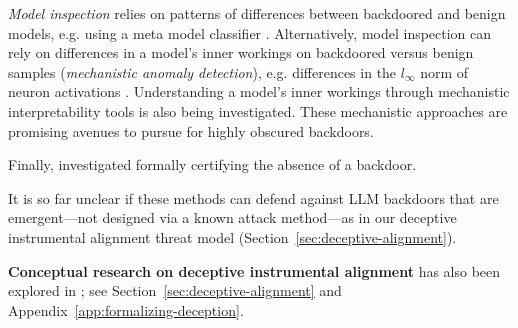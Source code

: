 \documentclass[11pt]{article}
\newcommand\todo[1]{\textcolor{badred}{#1}}
\renewcommand{\S}{Section~}
\begin{document}
\textit{Model inspection} relies on patterns of differences between backdoored and benign models, e.g. using a meta model classifier \citep{xu2021detecting,universal_litmus}. Alternatively, model inspection can rely on differences in a model's inner workings on backdoored versus benign samples (\textit{mechanistic anomaly detection}), e.g. differences in the $l_\infty$ norm of neuron activations \citep{xu2020defending}. Understanding a model's inner workings through mechanistic interpretability tools \citep{olsson2022context, casper2023benchmarking} is also being investigated. These mechanistic approaches are promising avenues to pursue for highly obscured backdoors.

Finally, \citet{weber2023rab} investigated formally certifying the absence of a backdoor.

It is so far unclear if these methods can defend against LLM backdoors that are emergent---not designed via a known attack method---as in our deceptive instrumental alignment threat model (\S\ref{sec:deceptive-alignment}).

\textbf{Conceptual research on deceptive instrumental alignment} has also been explored in \citet{hubinger2019risks, ngo2022alignment, carlsmith2023scheming}; see \S\ref{sec:deceptive-alignment} and Appendix~\ref{app:formalizing-deception}.



\end{document}
